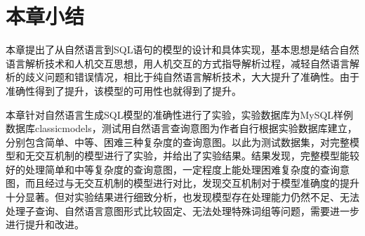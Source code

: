 \section{本章小结}
本章提出了从自然语言到SQL语句的模型的设计和具体实现，基本思想是结合自然语言解析技术和人机交互思想，用人机交互的方式指导解析过程，减轻自然语言解析的歧义问题和错误情况，相比于纯自然语言解析技术，大大提升了准确性。由于准确性得到了提升，该模型的可用性也就得到了提升。

本章针对自然语言生成SQL模型的准确性进行了实验，实验数据库为MySQL样例数据库classicmodels，测试用自然语言查询意图为作者自行根据实验数据库建立，分别包含简单、中等、困难三种复杂度的查询意图。以此为测试数据集，对完整模型和无交互机制的模型进行了实验，并给出了实验结果。结果发现，完整模型能较好的处理简单和中等复杂度的查询意图，一定程度上能处理困难复杂度的查询意图，而且经过与无交互机制的模型进行对比，发现交互机制对于模型准确度的提升十分显著。但对实验结果进行细致分析，也发现模型存在处理能力仍然不足、无法处理子查询、自然语言意图形式比较固定、无法处理特殊词组等问题，需要进一步进行提升和改进。




